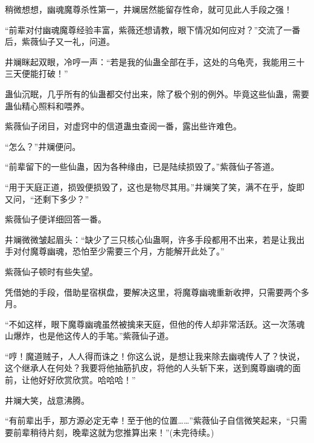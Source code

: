 \begin{this_body}
稍微想想，幽魂魔尊杀性第一，井斓居然能留存性命，就可见此人手段之强！

“前辈对付幽魂魔尊经验丰富，紫薇还想请教，眼下情况如何应对？”交流了一番后，紫薇仙子又一礼，问道。

井斓眯起双眼，冷哼一声：“若是我的仙蛊全部在手，这处的乌龟壳，我能用三十三天便能打破！”

蛊仙沉眠，几乎所有的仙蛊都交付出来，除了极个别的例外。毕竟这些仙蛊，需要蛊仙精心照料和喂养。

紫薇仙子闭目，对虚窍中的信道蛊虫查阅一番，露出些许难色。

“怎么？”井斓便问。

“前辈留下的一些仙蛊，因为各种缘由，已是陆续损毁了。”紫薇仙子答道。

“用于天庭正道，损毁便损毁了，这也是物尽其用。”井斓笑了笑，满不在乎，旋即又问，“还剩下多少？”

紫薇仙子便详细回答一番。

井斓微微皱起眉头：“缺少了三只核心仙蛊啊，许多手段都用不出来，若是让我出手对付魔尊幽魂，恐怕至少需要三个月，方能解开此处了。”

紫薇仙子顿时有些失望。

凭借她的手段，借助星宿棋盘，要解决这里，将魔尊幽魂重新收押，只需要两个多月。

“不如这样，眼下魔尊幽魂虽然被擒来天庭，但他的传人却非常活跃。这一次荡魂山爆炸，也是他这传人的手笔。”紫薇仙子道。

“哼！魔道贼子，人人得而诛之！你这么说，是想让我来除去幽魂传人了？快说，这个继承人在何处？我要将他抽筋扒皮，将他的人头斩下来，送到魔尊幽魂的面前，让他好好欣赏欣赏。哈哈哈！”

井斓大笑，战意沸腾。

“有前辈出手，那方源必定无幸！至于他的位置……”紫薇仙子自信微笑起来，“只需要前辈稍待片刻，晚辈这就为您推算出来！”(未完待续。)

\end{this_body}

